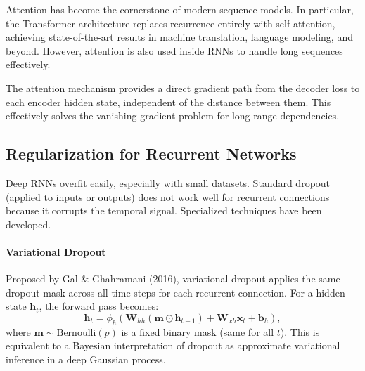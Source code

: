 \documentclass{tufte-handout}
\begin{document}
Attention has become the cornerstone of modern sequence models. In particular, the Transformer architecture replaces recurrence entirely with self-attention, achieving state-of-the-art results in machine translation, language modeling, and beyond. However, attention is also used inside RNNs to handle long sequences effectively.

\begin{thm}
    The attention mechanism provides a direct gradient path from the decoder loss to each encoder hidden state, independent of the distance between them. This effectively solves the vanishing gradient problem for long-range dependencies.
\end{thm}

\subsection{Regularization for Recurrent Networks}

Deep RNNs overfit easily, especially with small datasets. Standard dropout (applied to inputs or outputs) does not work well for recurrent connections because it corrupts the temporal signal. Specialized techniques have been developed.

\paragraph{Variational Dropout}
Proposed by Gal \& Ghahramani (2016), variational dropout applies the same dropout mask across all time steps for each recurrent connection. For a hidden state $\mathbf{h}_t$, the forward pass becomes:
\[
\mathbf{h}_t = \phi_h(\mathbf{W}_{hh}(\mathbf{m} \odot \mathbf{h}_{t-1}) + \mathbf{W}_{xh}\mathbf{x}_t + \mathbf{b}_h),
\]
where $\mathbf{m} \sim \text{Bernoulli}(p)$ is a fixed binary mask (same for all $t$). This is equivalent to a Bayesian interpretation of dropout as approximate variational inference in a deep Gaussian process.

\begin{marginfigure}
\centering
{}
\caption{Variational dropout: same mask $\mathbf{m}$ applied at every time step.}
\end{marginfigure}
\end{document}

